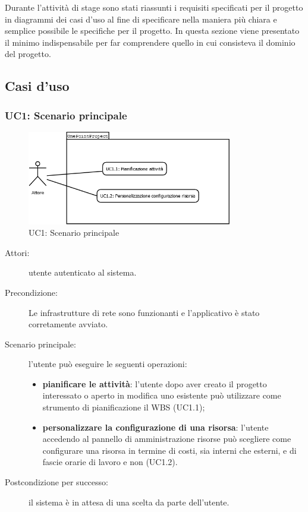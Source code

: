 Durante l\textquoteright{}attivit\`{a} di stage sono stati riassunti i requisiti specificati per il progetto in diagrammi dei casi d\textquoteright{}uso al fine di specificare nella maniera pi\`{u} chiara e semplice possibile le specifiche per il progetto. In questa sezione viene presentato il minimo indispensabile per far comprendere quello in cui consisteva il dominio del progetto.  

\subsection{Casi d\textquoteright{}uso}

\subsubsection[UC1: Scenario principale]{UC1: Scenario principale}
\begin{figure}[H]
\begin{center}
\includegraphics[width=0.80\textwidth]{img/UC/UC1.png}
\caption{UC1: Scenario principale}
\label{fig:UC1}
\end{center}
\end{figure}

\begin{description}
\item[Attori:]{utente autenticato al sistema.}
\item[Precondizione:]{Le infrastrutture di rete sono funzionanti e l\textquoteright{}applicativo \`{e} stato corretamente avviato.}
\item[Scenario principale:]{l\textquoteright{}utente pu\`{o} eseguire le seguenti operazioni:
	\begin{itemize}
	\item \textbf{pianificare le attivit\`{a}}: l\textquoteright{}utente dopo aver creato il progetto interessato o aperto in modifica uno esistente pu\`{o} utilizzare come strumento di pianificazione il WBS (UC1.1);
	\item \textbf{personalizzare la configurazione di una risorsa}: l\textquoteright{}utente accedendo al pannello di amministrazione risorse pu\`{o} scegliere come configurare una risorsa in termine di costi, sia interni che esterni, e di fascie orarie di lavoro e non (UC1.2).
	\end{itemize}}
\item[Postcondizione per successo:]{il sistema \`{e} in attesa di una scelta da parte dell\textquoteright{}utente.}
\end{description}

